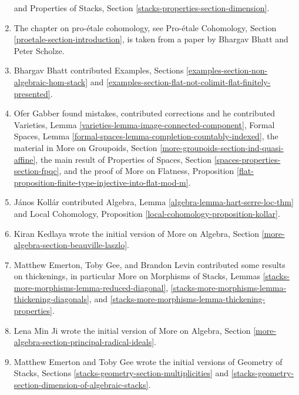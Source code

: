 \begin{enumerate}
and
Properties of Stacks, Section \ref{stacks-properties-section-dimension}.
\item The chapter on pro-\'etale cohomology, see
Pro-\'etale Cohomology, Section \ref{proetale-section-introduction},
is taken from a paper by Bhargav Bhatt and Peter Scholze.
\item Bhargav Bhatt contributed Examples, Sections
\ref{examples-section-non-algebraic-hom-stack} and
\ref{examples-section-flat-not-colimit-flat-finitely-presented}.
\item Ofer Gabber found mistakes, contributed corrections and he
contributed
Varieties, Lemma \ref{varieties-lemma-image-connected-component},
Formal Spaces, Lemma \ref{formal-spaces-lemma-completion-countably-indexed},
the material in
More on Groupoids, Section \ref{more-groupoids-section-ind-quasi-affine},
the main result of
Properties of Spaces, Section \ref{spaces-properties-section-fpqc},
and the proof of
More on Flatness, Proposition
\ref{flat-proposition-finite-type-injective-into-flat-mod-m}.
\item J\'anos Koll\'ar contributed
Algebra, Lemma \ref{algebra-lemma-hart-serre-loc-thm} and
Local Cohomology, Proposition \ref{local-cohomology-proposition-kollar}.
\item Kiran Kedlaya wrote the initial version of
More on Algebra, Section \ref{more-algebra-section-beauville-laszlo}.
\item Matthew Emerton, Toby Gee, and Brandon Levin contributed
some results on thickenings, in particular
More on Morphisms of Stacks, Lemmas
\ref{stacks-more-morphisms-lemma-reduced-diagonal},
\ref{stacks-more-morphisms-lemma-thickening-diagonals}, and
\ref{stacks-more-morphisms-lemma-thickening-properties}.
\item Lena Min Ji wrote the initial version of
More on Algebra, Section \ref{more-algebra-section-principal-radical-ideals}.
\item Matthew Emerton and Toby Gee wrote the initial versions of
Geometry of Stacks,
Sections \ref{stacks-geometry-section-multiplicities} and
\ref{stacks-geometry-section-dimension-of-algebraic-stacks}.
\end{enumerate}









